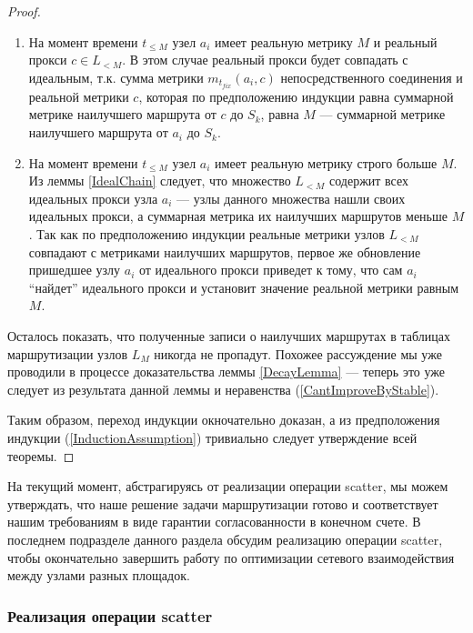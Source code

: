 \documentclass{article}
\theoremstyle{plain}
\theoremstyle{plain}
\theoremstyle{plain}
\theoremstyle{plain}
\theoremstyle{definition}
\theoremstyle{remark}
\theoremstyle{plain}
\begin{document}
\begin{proof}
    \begin{enumerate}
        \item На момент времени $t_{\leq M}$ узел $a_i$ имеет реальную метрику $M$ и реальный прокси $c \in L_{< M}$. В этом случае реальный прокси будет совпадать с идеальным, т.к. сумма метрики $m_{t_{fix}}(a_i, c)$ непосредственного соединения и реальной метрики $c$, которая по предположению индукции равна суммарной метрике наилучшего маршрута от $c$ до $S_k$, равна $M$ --- суммарной метрике наилучшего маршрута от $a_i$ до $S_k$.
        
        \item На момент времени $t_{\leq M}$ узел $a_i$ имеет реальную метрику строго больше $M$. Из леммы \ref{IdealChain} следует, что множество $L_{< M}$ содержит всех идеальных прокси узла $a_i$ --- узлы данного множества нашли своих идеальных прокси, а суммарная метрика их наилучших маршрутов меньше $M$. Так как по предположению индукции реальные метрики узлов $L_{< M}$ совпадают с метриками наилучших маршрутов, первое же обновление пришедшее узлу $a_i$ от идеального прокси приведет к тому, что сам $a_i$ \enquote{найдет} идеального прокси и установит значение реальной метрики равным $M$.
    \end{enumerate}
    
    Осталось показать, что полученные записи о наилучших маршрутах в таблицах маршрутизации узлов $L_M$ никогда не пропадут. Похожее рассуждение мы уже проводили в процессе доказательства леммы \ref{DecayLemma} --- теперь это уже следует из результата данной леммы и неравенства (\ref{CantImproveByStable}).
    
    Таким образом, переход индукции окночательно доказан, а из предположения индукции (\ref{InductionAssumption}) тривиально следует утверждение всей теоремы.
\end{proof}

На текущий момент, абстрагируясь от реализации операции scatter, мы можем утверждать, что наше решение задачи маршрутизации готово и соответствует нашим требованиям в виде гарантии согласованности в конечном счете. В последнем подразделе данного раздела обсудим реализацию операции scatter, чтобы окончательно завершить работу по оптимизации сетевого взаимодействия между узлами разных площадок.

\subsubsection{Реализация операции scatter}
\label{ScatterImplementation}
\end{document}
